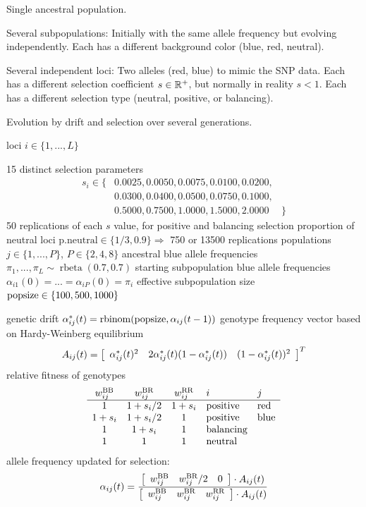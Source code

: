 \documentclass[a4paper,12pt]{article}
\begin{document}
 Single ancestral population.

 Several subpopulations:
   Initially with the same allele frequency but evolving
    independently.
   Each has a different background color (blue, red, neutral).

 Several independent loci:
   Two alleles (red, blue) to mimic the SNP data.
   Each has a different selection coefficient $s\in \RR^+$, but
    normally in reality $s<1$.
   Each has a different selection type (neutral, positive, or balancing).

 Evolution by drift and selection over several generations.


 loci $i \in \{1, ...,  L\}$

 15 distinct selection parameters 
$$
\begin{array}{lll}
s_i\in \{ & 0.0025,0.0050,0.0075,0.0100,0.0200,\\
          & 0.0300,0.0400,0.0500,0.0750,0.1000,\\
          & 0.5000,0.7500,1.0000,1.5000,2.0000 & \}
\end{array}
$$
 50 replications of each $s$ value, for positive and balancing selection
 proportion of neutral loci $\text{p.neutral}\in\{1/3,0.9\}
  \Rightarrow$ 750 or 13500 replications
 populations $j\in\{1, ..., P\}$, $P\in \{2,4,8\}$
 ancestral blue allele frequencies $\pi_1, ..., \pi_L\sim
  \operatorname{rbeta}(0.7,0.7)$
 starting subpopulation blue allele frequencies $\alpha_{i1}(0) = ... = \alpha_{iP}(0) = \pi_i $
 effective subpopulation size $\neff\in\{100,500,1000\}$

 genetic drift $\aijs = \operatorname{rbinom}(\neff,\alpha_{ij}(t-1))$
 genotype frequency vector based on Hardy-Weinberg equilibrium
$$ A_{ij}(t) = 
\left[
\begin{array}{ccc}
\aijs^2 & 2\aijs(1-\aijs) & (1-\aijs)^2
\end{array}
\right]^T$$
 relative fitness of genotypes 
$$
\begin{array}{cccll}
\wij{BB} & \wij{BR} & \wij{RR} & i & j\\
\hline
1 & 1+s_i/2 & 1+s_i & \text{positive}& \text{red}\\
1+s_i & 1+s_i/2 & 1 & \text{positive}& \text{blue}\\
1 & 1+s_i & 1 & \text{balancing}& \\
1 & 1 & 1 & \text{neutral}& 
\end{array}
$$
 allele frequency updated for selection:
$$\aij = \frac{
\brat{ccc}{\wij{BB}&\wij{BR}/2&0} \cdot A_{ij}(t) }{
\brat{ccc}{\wij{BB}&\wij{BR}&\wij{RR}} \cdot A_{ij}(t)
   }$$
\end{document}
